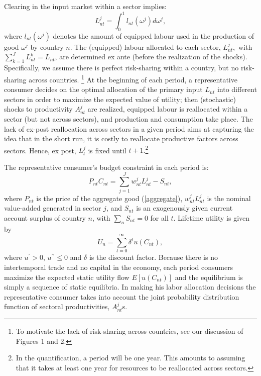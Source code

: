 \documentclass[12pt]{article}
\begin{document}
Clearing in the input market within a sector implies: 
\begin{equation*}
L_{nt}^{j}=\int_{0}^{1}l_{nt}(\omega ^{j})d\omega ^{j},
\end{equation*}%
where $l_{nt}(\omega ^{j})$ denotes the amount of equipped labour used in
the production of good $\omega ^{j}$ by country $n$. The (equipped) labour
allocated to each sector, $L_{nt}^{j},$ with $\sum%
\nolimits_{k=1}^{J}L_{nt}^{k}=L_{nt}$, are determined ex ante (before the
realization of the shocks). Specifically, we assume there is perfect
risk-sharing within a country, but no risk-sharing across countries.%
\footnote{%
To motivate the lack of risk-sharing across countries, see our discussion of
Figures 1 and 2.} At the beginning of each period, a representative consumer
decides on the optimal allocation of the primary input $L_{nt}$ into
different sectors in order to maximize the expected value of utility; then
(stochastic) shocks to productivity $A_{nt}^{j}$ are realized, equipped
labour is reallocated within a sector (but not across sectors), and
production and consumption take place. The lack of ex-post reallocation
across sectors in a given period aims at capturing the idea that in the
short run, it is costly to reallocate productive factors across sectors.
Hence, ex post, $L_{t}^{j}$ is fixed until $t+1.$\footnote{%
In the quantification, a period will be one year. This amounts to assuming
that it takes at least one year for resources to be reallocated across
sectors.}

The representative consumer's budget constraint in each period is: 
\begin{equation*}
P_{nt}C_{nt}=\sum_{j=1}^{J}w_{nt}^{j}L_{nt}^{j}-S_{nt},
\end{equation*}
where $P_{nt}$ is the price of the aggregate good (\ref{aggregate}), $%
w_{nt}^{j}L_{nt}^{j}$ is the nominal value-added generated in sector $j$,
and $S_{nt}$ is an exogenously given current account surplus of country $n$,
with $\sum_n S_{nt}=0$ for all $t$.
Lifetime utility is given by 
\begin{equation*}
U_{n}=\sum\limits_{t=0}^{\infty }\delta^{t}u(C_{nt}),
\end{equation*}
where $u^{\prime} > 0$, $u^{\prime\prime} \leq 0$ and $\delta$ is the
discount factor. Because there is no intertemporal trade and no capital in
the economy, each period consumers maximize the expected static utility flow 
$E\left[ u\left( C_{nt}\right) \right] $ and the equilibrium is simply a
sequence of static equilibria. In making his labor allocation decisions the
representative consumer takes into account the joint probability
distribution function of sectoral productivities, $A_{nt}^{j}$s.
\end{document}
